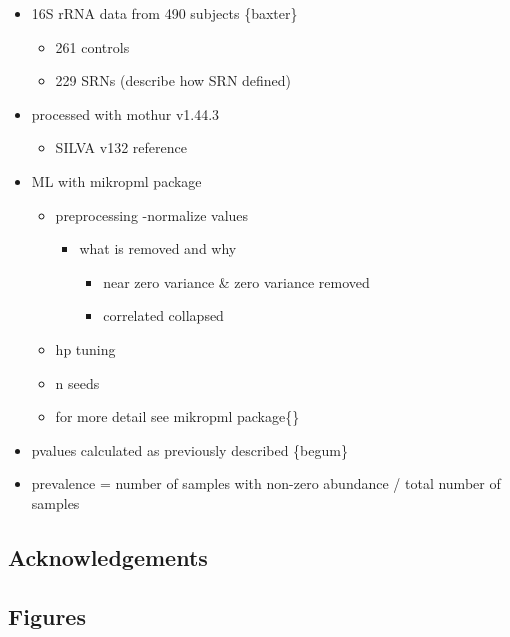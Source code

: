 \documentclass[
]{article}
\providecommand{\tightlist}{%
  \setlength{\itemsep}{0pt}\setlength{\parskip}{0pt}}
\begin{document}
\begin{itemize}
\tightlist
\item
  16S rRNA data from 490 subjects \{baxter\}

  \begin{itemize}
  \tightlist
  \item
    261 controls
  \item
    229 SRNs (describe how SRN defined)
  \end{itemize}
\item
  processed with mothur v1.44.3

  \begin{itemize}
  \tightlist
  \item
    SILVA v132 reference
  \end{itemize}
\item
  ML with mikropml package

  \begin{itemize}
  \tightlist
  \item
    preprocessing -normalize values

    \begin{itemize}
    \tightlist
    \item
      what is removed and why

      \begin{itemize}
      \tightlist
      \item
        near zero variance \& zero variance removed
      \item
        correlated collapsed
      \end{itemize}
    \end{itemize}
  \item
    hp tuning
  \item
    n seeds
  \item
    for more detail see mikropml package\{\}
  \end{itemize}
\item
  pvalues calculated as previously described \{begum\}
\item
  prevalence = number of samples with non-zero abundance / total number
  of samples
\end{itemize}

\hypertarget{acknowledgements}{%
\subsection{Acknowledgements}\label{acknowledgements}}

\hypertarget{figures}{%
\subsection{Figures}\label{figures}}
\end{document}
